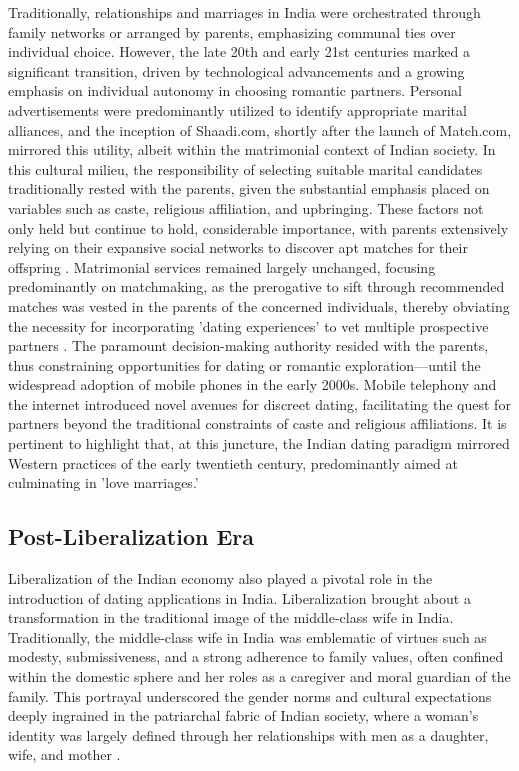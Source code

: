 Traditionally, relationships and marriages in India were orchestrated through family networks or arranged by parents, emphasizing communal ties over individual choice. However, the late 20th and early 21st centuries marked a significant transition, driven by technological advancements and a growing emphasis on individual autonomy in choosing romantic partners. Personal advertisements were predominantly utilized to identify appropriate marital alliances, and the inception of Shaadi.com, shortly after the launch of Match.com, mirrored this utility, albeit within the matrimonial context of Indian society. In this cultural milieu, the responsibility of selecting suitable marital candidates traditionally rested with the parents, given the substantial emphasis placed on variables such as caste, religious affiliation, and upbringing. These factors not only held but continue to hold, considerable importance, with parents extensively relying on their expansive social networks to discover apt matches for their offspring \cite{sharma_towards_2019, seth_online_2008}. Matrimonial services remained largely unchanged, focusing predominantly on matchmaking, as the prerogative to sift through recommended matches was vested in the parents of the concerned individuals, thereby obviating the necessity for incorporating 'dating experiences' to vet multiple prospective partners \cite{titzmann_changing_2013}. The paramount decision-making authority resided with the parents, thus constraining opportunities for dating or romantic exploration—until the widespread adoption of mobile phones in the early 2000s. Mobile telephony and the internet introduced novel avenues for discreet dating, facilitating the quest for partners beyond the traditional constraints of caste and religious affiliations. It is pertinent to highlight that, at this juncture, the Indian dating paradigm mirrored Western practices of the early twentieth century, predominantly aimed at culminating in 'love marriages.'

\subsection*{Post-Liberalization Era}
Liberalization of the Indian economy also played a pivotal role in the introduction of dating applications in India. Liberalization brought about a transformation in the traditional image of the middle-class wife in India. Traditionally, the middle-class wife in India was emblematic of virtues such as modesty, submissiveness, and a strong adherence to family values, often confined within the domestic sphere and her roles as a caregiver and moral guardian of the family. This portrayal underscored the gender norms and cultural expectations deeply ingrained in the patriarchal fabric of Indian society, where a woman's identity was largely defined through her relationships with men as a daughter, wife, and mother \cite{Dell_2005}.

